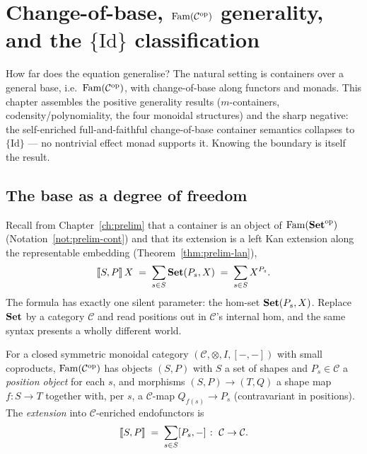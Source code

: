 \chapter{Change-of-base, $\mathrm{Fam}(\mathcal{C}^{\mathrm{op}})$ generality, and the $\{\mathrm{Id}\}$ classification}
\label{ch:cob}
How far does the equation generalise? The natural setting is containers over a
general base, i.e.\ $\mathrm{Fam}(\mathcal{C}^{\mathrm{op}})$, with change-of-base along
functors and monads. This chapter assembles the positive generality results
($m$-containers, codensity/polynomiality, the four monoidal structures) and the
sharp negative: the self-enriched full-and-faithful change-of-base container
semantics collapses to $\{\mathrm{Id}\}$ --- no nontrivial effect monad supports
it. Knowing the boundary is itself the result.

\section{The base as a degree of freedom}
\label{sec:cob-setup}

Recall from Chapter~\ref{ch:prelim} that a container is an object of
$\mathrm{Fam}(\mathbf{Set}^{\mathrm{op}})$ (Notation~\ref{not:prelim-cont}) and that its extension is a
left Kan extension along the representable embedding (Theorem~\ref{thm:prelim-lan}),
\[
  \llbracket S,P \rrbracket\,X \;=\; \sum_{s\in S}\mathbf{Set}(P_s,X)\;=\;\sum_{s\in S}X^{P_s}.
\]
The formula has exactly one silent parameter: the hom-set $\mathbf{Set}(P_s,X)$. Replace
$\mathbf{Set}$ by a category $\mathcal{C}$ and read positions out in $\mathcal{C}$'s
internal hom, and the same syntax presents a wholly different world.

\begin{definition}\label{def:cob-fam}
For a closed symmetric monoidal category $(\mathcal{C},\otimes,I,[-,-])$ with
small coproducts, $\mathrm{Fam}(\mathcal{C}^{\mathrm{op}})$ has objects $(S,P)$ with $S$ a set of
shapes and $P_s\in\mathcal{C}$ a \emph{position object} for each $s$, and
morphisms $(S,P)\to(T,Q)$ a shape map $f\colon S\to T$ together with, per $s$, a
$\mathcal{C}$-map $Q_{f(s)}\to P_s$ (contravariant in positions). The
\emph{extension} into $\mathcal{C}$-enriched endofunctors is
\[
  \llbracket S,P \rrbracket\;=\;\sum_{s\in S}[P_s,-]\;\colon\;\mathcal{C}\to\mathcal{C}.
\]
\end{definition}


